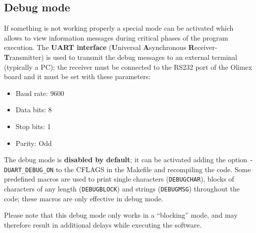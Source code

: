 
\subsection{Debug mode}
If something is not working properly a special mode can be activated which allows to view information messages during critical phases of the program execution. The \textbf{UART interface} (\textbf{U}niversal \textbf{A}synchronous \textbf{R}eceiver-\textbf{T}ransmitter) is used to transmit the debug messages to an external terminal (typically a PC); the receiver must be connected to the RS232 port of the Olimex board and it must be set with these parameters:
\begin{itemize}
	\item Baud rate: 9600
	\item Data bits: 8
	\item Stop bits: 1
	\item Parity: Odd
\end{itemize}
The debug mode is \textbf{disabled by default}; it can be activated adding the option \texttt{-DUART\_DEBUG\_ON} to the CFLAGS in the Makefile and recompiling the code. Some predefined macros are used to print single characters (\texttt{DEBUGCHAR}), blocks of characters of any length (\texttt{DEBUGBLOCK}) and strings (\texttt{DEBUGMSG}) throughout the code; these macros are only effective in debug mode.

Please note that this debug mode only works in a ``blocking'' mode, and may therefore result in additional delays while executing the software.
